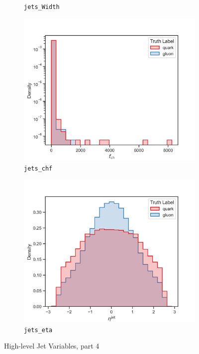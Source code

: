 \begin{figure}[!htb]
\begin{subfigure}[t]{0.49\textwidth}
		\caption{\texttt{jets\_Width}}
		\label{fig:highlevel_21}
	\end{subfigure}
	\begin{subfigure}[t]{0.49\textwidth}
		\includegraphics[width=1\textwidth]{src/plots/distributions/highlevel/jets_chf.png}
		\caption{\texttt{jets\_chf}}
		\label{fig:highlevel_22}
	\end{subfigure}
	\begin{subfigure}[t]{0.49\textwidth}
		\includegraphics[width=1\textwidth]{src/plots/distributions/highlevel/jets_eta.png}
		\caption{\texttt{jets\_eta}}
		\label{fig:highlevel_23}
	\end{subfigure}
\caption{High-level Jet Variables, part 4}
\label{fig:highlevel_18-23}
\end{figure}

